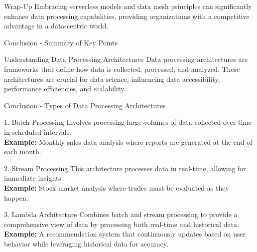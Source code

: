 \documentclass[aspectratio=169]{beamer}
\begin{document}
\begin{frame}[fragile]{Wrap-Up}
    Embracing serverless models and data mesh principles can significantly enhance data processing capabilities, 
    providing organizations with a competitive advantage in a data-centric world.
\end{frame}

\begin{frame}[fragile]{Conclusion - Summary of Key Points}
  \begin{block}{Understanding Data Processing Architectures}
    Data processing architectures are frameworks that define how data is collected, processed, and analyzed. These architectures are crucial for data science, influencing data accessibility, performance efficiencies, and scalability.
  \end{block}
\end{frame}

\begin{frame}[fragile]{Conclusion - Types of Data Processing Architectures}
  \begin{block}{1. Batch Processing}
    Involves processing large volumes of data collected over time in scheduled intervals. \\
    \textbf{Example:} Monthly sales data analysis where reports are generated at the end of each month.
  \end{block}

  \begin{block}{2. Stream Processing}
    This architecture processes data in real-time, allowing for immediate insights. \\
    \textbf{Example:} Stock market analysis where trades must be evaluated as they happen.
  \end{block}

  \begin{block}{3. Lambda Architecture}
    Combines batch and stream processing to provide a comprehensive view of data by processing both real-time and historical data. \\
    \textbf{Example:} A recommendation system that continuously updates based on user behavior while leveraging historical data for accuracy.
  \end{block}
\end{frame}
\end{document}
